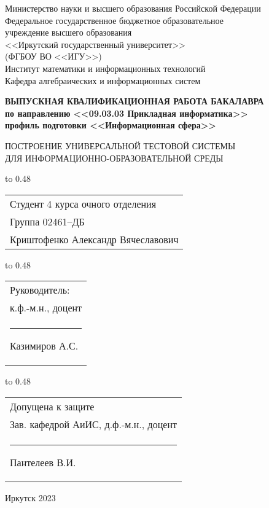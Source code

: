 \thispagestyle{empty}
\begin{center}
Министерство науки и высшего образования Российской Федерации\\
Федеральное государственное бюджетное образовательное\\
учреждение высшего образования\\
<<Иркутский государственный университет>>\\
(ФГБОУ ВО <<ИГУ>>)\\
Институт математики и информационных технологий\\
Кафедра алгебраических и информационных систем\\
\end{center}

\vspace{2.7cm}

\begin{center}
{\bf 
ВЫПУСКНАЯ КВАЛИФИКАЦИОННАЯ РАБОТА
БАКАЛАВРА\\[1mm]
по направлению <<09.03.03 Прикладная информатика>>\\[1mm]
профиль подготовки <<Информационная сфера>>
}  

\vspace{0.9cm}

{
ПОСТРОЕНИЕ УНИВЕРСАЛЬНОЙ 
ТЕСТОВОЙ СИСТЕМЫ\\[1mm]
ДЛЯ ИНФОРМАЦИОННО-ОБРАЗОВАТЕЛЬНОЙ СРЕДЫ 
} %
\end{center}

\vspace{1.8cm}

{
\noindent\hbox to 0.48\textwidth {%
	\mbox{ } \hfil} %
	\begin{tabular}[t]{l}
		Студент 4 курса очного отделения\\
		Группа 02461--ДБ\\
		Криштофенко Александр 
		Вячеславович		
	\end{tabular}		
}

\vspace{0.8cm}

{
\noindent\hbox to 0.48\textwidth {%
	\mbox{ } \hfil} %
	\begin{tabular}[t]{l}
		Руководитель:\\ к.ф.-м.н., доцент\\
		\rule{2.7cm}{0.5pt} Казимиров А.С.		
	\end{tabular}		
}

\vspace{0.8cm}

{
	\noindent\hbox to 0.48\textwidth {%
		\mbox{ } \hfil} %
	\begin{tabular}[t]{l}
		Допущена к защите\\
		Зав. кафедрой АиИС, д.ф.-м.н., доцент \\
		\rule{2.7cm}{0.5pt} Пантелеев В.И.
	\end{tabular}		
}

\vspace{0.8cm}

\vfill 
\noindent
\begin{minipage}{\textwidth}
\centering	 Иркутск 2023
\end{minipage}